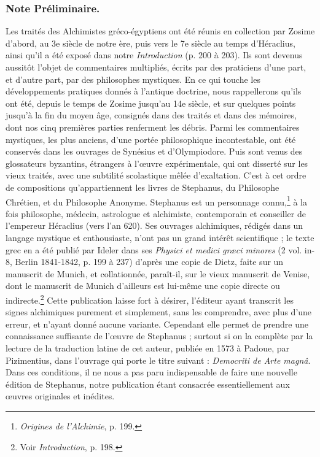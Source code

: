 \documentclass[a4paper, 11pt, oneside, polutonikogreek, french]{article}
\begin{document}
\subsubsection{Note Préliminaire.}

Les traités des Alchimistes gréco-égyptiens ont été réunis en collection par Zosime d'abord, au 3e siècle de notre ère, puis vers le 7e siècle au temps d'Héraclius, ainsi qu'il a été exposé dans notre \emph{Introduction} (p. 200 à 203). Ils sont devenus aussitôt l'objet de commentaires multipliés, écrits par des praticiens d'une part, et d'autre part, par des philosophes mystiques. En ce qui touche les développements pratiques donnés à l'antique doctrine, nous rappellerons qu'ils ont été, depuis le temps de Zosime jusqu'au 14e siècle, et sur quelques points jusqu'à la fin du moyen âge, consignés dans des traités et dans des mémoires, dont nos cinq premières parties renferment les débris. Parmi les commentaires mystiques, les plus anciens, d'une portée philosophique incontestable, ont été conservés dans les ouvrages de Synésius et d'Olympiodore. Puis sont venus des glossateurs byzantins, étrangers à l'œuvre expérimentale, qui ont disserté sur les vieux traités, avec une subtilité scolastique mêlée d'exaltation. C'est à cet ordre de compositions qu'appartiennent les livres de Stephanus, du Philosophe Chrétien, et du Philosophe Anonyme. Stephanus est un personnage connu,\footnote{\emph{Origines de l'Alchimie}, p. 199.} à la fois philosophe, médecin, astrologue et alchimiste, contemporain et conseiller de l'empereur Héraclius (vers l'an 620). Ses ouvrages alchimiques, rédigés dans un langage mystique et enthousiaste, n'ont pas un grand intérêt scientifique ; le texte grec en a été publié par Ideler dans ses \emph{Physici et medici græci minores} (2 vol. in-8, Berlin 1841-1842, p. 199 à 237) d'après une copie de Dietz, faite sur un manuscrit de Munich, et collationnée, paraît-il, sur le vieux manuscrit de Venise, dont le manuscrit de Munich d'ailleurs est lui-même une copie directe ou indirecte.\footnote{Voir \emph{Introduction}, p. 198.} Cette publication laisse fort à désirer, l'éditeur ayant transcrit les signes alchimiques purement et simplement, sans les comprendre, avec plus d'une erreur, et n'ayant donné aucune variante. Cependant elle permet de prendre une connaissance suffisante de l'œuvre de Stephanus ; surtout si on la complète par la lecture de la traduction latine de cet auteur, publiée en 1573 à Padoue, par Pizimentius, dans l'ouvrage qui porte le titre suivant : \emph{Democriti de Arte magnâ}. Dans ces conditions, il ne nous a pas paru indispensable de faire une nouvelle édition de Stephanus, notre publication étant consacrée essentiellement aux œuvres originales et inédites.
\end{document}
